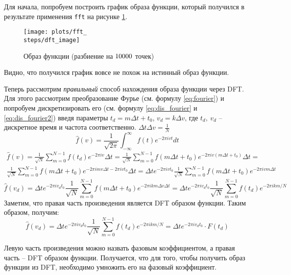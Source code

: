 Для начала, попробуем построить график образа функции, который получился в результате применения \texttt{fft} на рисунке \ref{fig:\steps_fft_image}.
\begin{figure}[ht!]
    \centering
    \texttt{[image: plots/fft\_\\steps/dft\_image]}
    \caption{Образ функции (разбиение на $10000$ точек)}
    \label{fig:\steps_fft_image}
\end{figure}

Видно, что получился график вовсе не похож на истинный образ функции. 

Теперь рассмотрим \textit{правильный} способ нахождения образа функции через DFT. 
Для этого рассмотрим преобразование Фурье (см. формулу \eqref{eq:fourier}) и попробуем дискретизировать его (см. формулу \eqref{eq:dis_fourier} и \eqref{eq:dis_fourier2}) введя параметры 
$t_d = m\Delta t + t_0$, $v_d = k\Delta v$, где $t_d,~v_d$ -- дискретное время и частота соответственно. $\Delta t \Delta v = \frac{1}{N}$
\begin{equation}
    \hat{f}(v) = \frac{1}{\sqrt{2\pi}}\int_{-\infty}^{\infty} f(t) e^{-2\pi i v t} dt 
    \label{eq:fourier}
\end{equation}
\begin{multline}
    \hat{f}(v) = \frac{1}{\sqrt{N}}\sum_{m=0}^{N-1} f(t_d) e^{-2\pi i v} \Delta t = \frac{1}{\sqrt{N}}\sum_{m=0}^{N-1} f(m\Delta t + t_0) e^{-2\pi i v( m\Delta t + t_0)} \Delta t = \\
    \frac{1}{\sqrt{N}}\sum_{m=0}^{N-1} f(m\Delta t + t_0) e^{-2\pi i m v \Delta t -2\pi i v t_0} \Delta t =  \Delta te^ {-2\pi i v t_0} \frac{1}{\sqrt{N}}\sum_{m=0}^{N-1} f(m\Delta t + t_0) e^{-2\pi i v m \Delta t} 
    \label{eq:dis_fourier} 
\end{multline}
\begin{equation}
    \hat{f}(v_d) = \Delta te^ {-2\pi i v_d t_0}\frac{1}{\sqrt{N}} \sum_{m=0}^{N-1} f(m\Delta t + t_0) e^{-2\pi i km \Delta v \Delta t} = \Delta te^ {-2\pi i v_d t_0}\frac{1}{\sqrt{N}} \sum_{m=0}^{N-1} f(t_d) e^{-2\pi i km / N} 
    \label{eq:dis_fourier2} 
\end{equation}
Заметим, что правая часть произведения является DFT образом функции. Таким образом, получим: 
\begin{equation}
    \hat{f}(v_d) = \Delta te^ {-2\pi i v_d t_0} \frac{1}{\sqrt{N}}\sum_{m=0}^{N-1} f(t_d) e^{-2\pi i km / N} = \Delta te^ {-2\pi i v_d t_0} \cdot F(t_d)
    \label{eq:dis_fourier3}
\end{equation}

Левую часть произведения можно назвать фазовым коэффициентом, а правая часть -- DFT образом функции. Получается, что для того, чтобы получить 
образ функции из DFT, необходимо умножить его на фазовый коэффициент. 

